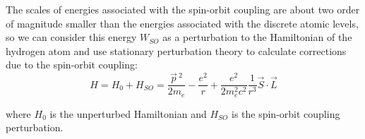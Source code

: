 The scales of energies associated with the spin-orbit coupling are about two order of magnitude smaller than the energies associated with the discrete atomic levels, so we can consider this energy $W_{SO}$ as a perturbation to the Hamiltonian of the hydrogen atom and use stationary perturbation theory to calculate corrections due to the spin-orbit coupling:
\begin{equation}
    H = H_0 + H_{SO} = \frac{\vec{p}\,^2}{2m_e}-\frac{e^2}{r} + \frac{e^2}{2m_e^2c^2}\frac{1}{r^3}\vec{S}\cdot \vec{L}
\end{equation}

where $H_0$ is the unperturbed Hamiltonian and $H_{SO}$ is the spin-orbit coupling perturbation.


